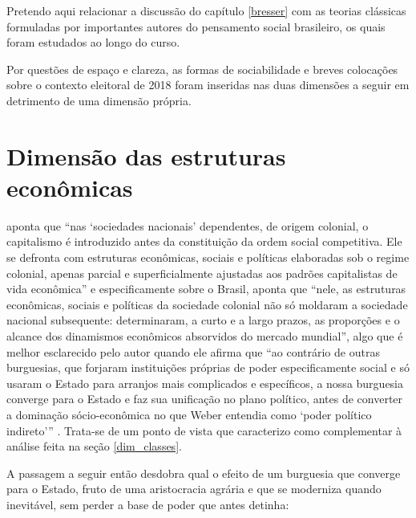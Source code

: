%
%
	
	Pretendo aqui relacionar a discussão do capítulo \ref{bresser} com as teorias clássicas formuladas por importantes autores do pensamento social brasileiro, os quais foram estudados ao longo do curso.
	
	Por questões de espaço e clareza, as formas de sociabilidade e breves colocações sobre o contexto eleitoral de 2018 foram inseridas nas duas dimensões a seguir em detrimento de uma dimensão própria.
	
	\section{Dimensão das estruturas econômicas}
	
	 aponta que ``nas `sociedades nacionais' dependentes, de origem colonial, o capitalismo é introduzido antes da constituição da ordem social competitiva. Ele se defronta com estruturas econômicas, sociais e políticas elaboradas sob o regime colonial, apenas parcial e superficialmente ajustadas aos padrões capitalistas de vida econômica'' e especificamente sobre o Brasil,  aponta que ``nele, as estruturas econômicas, sociais e políticas da sociedade colonial não só moldaram a sociedade nacional subsequente: determinaram, a curto e a largo prazos, as proporções e o alcance dos dinamismos econômicos absorvidos do mercado mundial'', algo que é melhor esclarecido pelo autor quando ele afirma que ``ao contrário de outras burguesias, que forjaram instituições próprias de poder especificamente social e só usaram o Estado para arranjos mais complicados e específicos, a nossa burguesia converge para o Estado e faz sua unificação no plano político, antes de converter a dominação sócio-econômica no que Weber entendia como `poder político indireto'{''} \cite[p. 204]{Fernandes1975}. Trata-se de um ponto de vista que caracterizo como complementar à análise feita na seção \ref{dim_classes}.
	
	A passagem a seguir então desdobra qual o efeito de um burguesia que converge para o Estado, fruto de uma aristocracia agrária e que se moderniza quando inevitável, sem  perder a base de poder que antes detinha:
	
